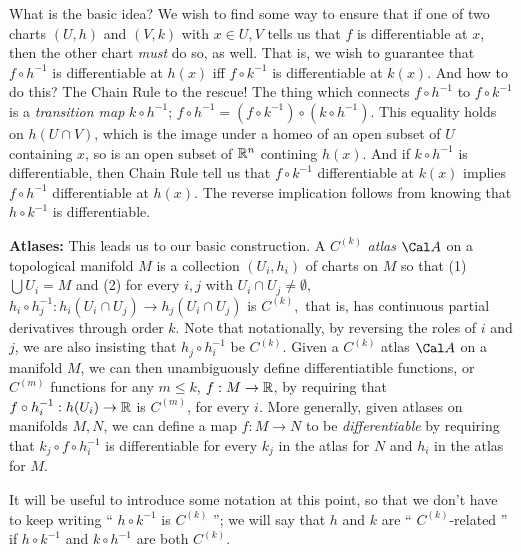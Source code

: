 \ssk

What is the basic idea? We wish to find some way to ensure that if one of two
charts $(U,h)$ and $(V,k)$ with $x\in U,V$ tells us that $f$ is differentiable 
at $x$, then the other chart {\it must} do so, as well. That is, we wish to guarantee
that $f\circ h^{-1}$ is differentiable at $h(x)$ iff $f\circ k^{-1}$ is differentiable 
at $k(x)$. And how to do this? The Chain Rule to the rescue! The thing which connects
$f\circ h^{-1}$ to $f\circ k^{-1}$ is a {\it transition map} 
$k\circ h^{-1}$; $f\circ h^{-1} = (f\circ k^{-1})\circ (k\circ h^{-1})$.
This equality holds on $h(U\cap V)$, which is the image under a homeo of an 
open subset of $U$ containing $x$, so is an open subset of ${\Bbb R}^n$ contining $h(x)$.
And if $k\circ h^{-1}$ is differentiable, then Chain Rule 
tell us that $f\circ k^{-1}$ differentiable 
at $k(x)$ implies $f\circ h^{-1}$ differentiable at $h(x)$. The reverse 
implication follows from knowing that $h\circ k^{-1}$ is differentiable.

\ssk

{\bf Atlases:} This leads us to our basic construction. A $C^{(k)}$ {\it atlas} ${\Cal A}$ on a 
topological manifold $M$ is a collection $(U_i,h_i)$ of charts on $M$ so that 
(1) $\bigcup U_i=M$ and (2) for every $i,j$ with $U_i\cap U_j\neq \emptyset$,
$h_i\circ h_j^{-1}:h_i(U_i\cap U_j)\rightarrow h_j(U_i\cap U_j)$ is $C^{(k)}$,\
that is, has continuous partial derivatives through order $k$. Note that
notationally, by reversing the roles of $i$ and $j$, we are also insisting
that $h_j\circ h_i^{-1}$ be $C^{(k)}$. Given a $C^{(k)}$ atlas ${\Cal A}$ on a manifold
$M$, we can then unambiguously define differentiatible functions,
or $C^{(m)}$ functions for any $m\leq k$, $f:M\rightarrow {\Bbb R}$,
by requiring that $f\circ h_i^{-1}:h(U_i)\rightarrow {\Bbb R}$ is $C^{(m)}$, for every $i$.
More generally, given atlases on manifolds $M,N$, we can define a map
$f:M\rightarrow N$ to be {\it differentiable } by requiring that 
$k_j\circ f\circ h_i^{-1}$ is differentiable
for every $k_j$ in the atlas for $N$ and $h_i$ in the atlas for $M$. 

It will be useful to introduce some notation at this point, so that we don't 
have to keep writing `` $h\circ k^{-1}$ is $C^{(k)}$ ''; we will say that $h$ and $k$ are 
`` $C^{(k)}$-related '' if $h\circ k^{-1}$ and $k\circ h^{-1}$ are both $C^{(k)}$. 

\msk

